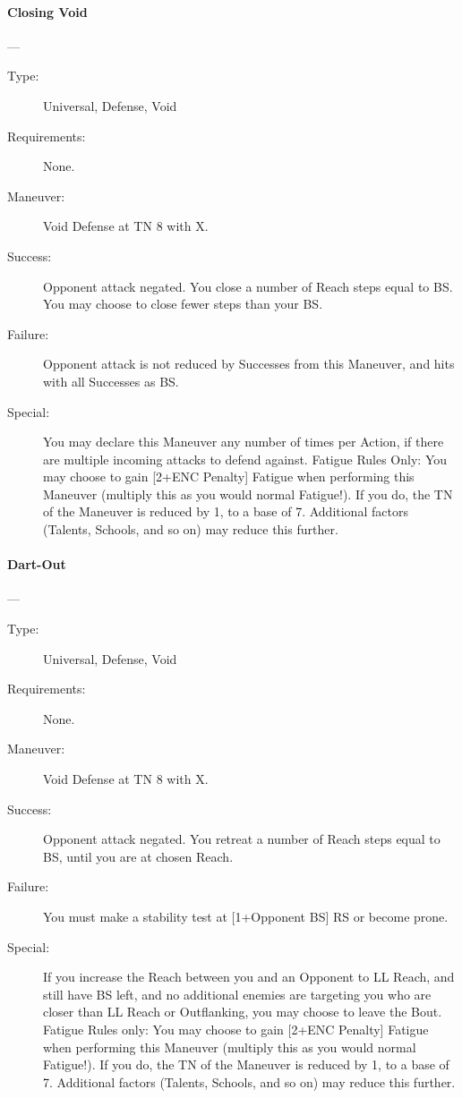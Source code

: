 \documentclass[oneside,11pt,english]{book}
\begin{document}
\paragraph{\large\label{man:Closing Void}Closing Void}---\quad{\large[X]}
\vspace{-10pt}\begin{description} 
\item [Type:] Universal, Defense, Void 
\item [Requirements:] None. 
\item [Maneuver:] Void Defense at TN 8 with X. 
\item [Success:] Opponent attack negated. You close a number of Reach steps equal to BS. You may choose to 
close fewer steps than your BS. 
\item [Failure:] Opponent attack is not reduced by Successes from this Maneuver, and hits with all Successes as 
BS. 
\item [Special:] You may declare this Maneuver any number of times per Action, if there are multiple incoming 
attacks to defend against. 
Fatigue Rules Only: You may choose to gain [2+ENC Penalty] Fatigue when performing this Maneuver 
(multiply this as you would normal Fatigue!). If you do, the TN of the Maneuver is reduced by 1, to a 
base of 7. Additional factors (Talents, Schools, and so on) may reduce this further. 
\end{description}
\paragraph{\large\label{man:Dart-Out}Dart-Out}---
\vspace{-10pt}\begin{description} 
\item [Type:] Universal, Defense, Void 
\item [Requirements:] None. 
\item [Maneuver:] Void Defense at TN 8 with X. 
\item [Success:] Opponent attack negated. You retreat a number of Reach steps equal to BS, until you are at 
chosen Reach. 
\item [Failure:] You must make a stability test at [1+Opponent BS] RS or become prone. 
\item [Special:] If you increase the Reach between you and an Opponent to LL Reach, and still have BS left, and 
no additional enemies are targeting you who are closer than LL Reach or Outflanking, you may choose to 
leave the Bout. 
Fatigue Rules only: You may choose to gain [2+ENC Penalty] Fatigue when performing this Maneuver 
(multiply this as you would normal Fatigue!). If you do, the TN of the Maneuver is reduced by 1, to a 
base of 7. Additional factors (Talents, Schools, and so on) may reduce this further. 
\end{description}
\end{document}
